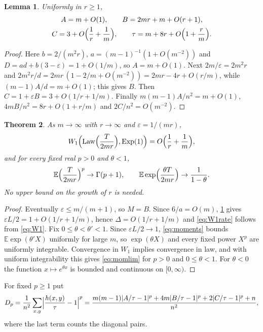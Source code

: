 \documentclass[11pt,a4paper]{article}
\numberwithin{equation}{section}
\newtheorem{theorem}{Theorem}[section]
\newtheorem{lemma}[theorem]{Lemma}
\theoremstyle{remark}
\newcommand{\E}{\mathbb E}
\newcommand{\eps}{\varepsilon}
\newcommand{\Exp}{\operatorname{Exp}}
\newcommand{\abs}[1]{\lvert#1\rvert}
\begin{document}
\begin{lemma}\label{lem:asym}
Uniformly in $r\ge1$,
\begin{gather*}
A=m+O(1),\qquad B=2mr+m+O(r+1),\\
C=3+O\Bigl(\frac1r+\frac1m\Bigr),\qquad \tau=m+8r+O\Bigl(1+\frac rm\Bigr).
\end{gather*}
\end{lemma}

\begin{proof}
Here $b=2/(m^2r)$, $a=(m-1)^{-1}(1+O(m^{-2}))$ and $D=ad+b(3-\eps)=1+O(1/m)$, so $A=m+O(1)$. Next $2m/\eps=2m^2r$ and $2m^2r/d=2mr\,(1-2/m+O(m^{-2}))=2mr-4r+O(r/m)$, while $(m-1)A/d=m+O(1)$; this gives $B$. Then $C=1+\eps B=3+O(1/r+1/m)$. Finally $m(m-1)A/n^2=m+O(1)$, $4mB/n^2=8r+O(1+r/m)$ and $2C/n^2=O(m^{-2})$.
\end{proof}

\begin{theorem}\label{thm:slow}
As $m\to\infty$ with $r\to\infty$ and $\eps=1/(mr)$,
\begin{equation}\label{eq:W1rate}
W_1\Bigl(\mathrm{Law}\Bigl(\frac T{2mr}\Bigr),\Exp(1)\Bigr)=O\Bigl(\frac1r+\frac1m\Bigr),
\end{equation}
and for every fixed real $p>0$ and $\theta<1$,
\begin{equation}\label{eq:momlim}
\E\Bigl(\frac T{2mr}\Bigr)^p\to\Gamma(p+1),\qquad \E\exp\Bigl(\frac{\theta T}{2mr}\Bigr)\to\frac1{1-\theta}.
\end{equation}
No upper bound on the growth of $r$ is needed.
\end{theorem}

\begin{proof}
Eventually $\eps\le m/(m+1)$, so $M=B$. Since $6/a=O(m)$, \cref{lem:asym} gives $\eps L/2=1+O(1/r+1/m)$, hence $\Delta=O(1/r+1/m)$ and \eqref{eq:W1rate} follows from \eqref{eq:W1}. Fix $0\le\theta<\theta'<1$. Since $\eps L/2\to1$, \eqref{eq:moments} bounds $\E\exp(\theta'X)$ uniformly for large $m$, so $\exp(\theta X)$ and every fixed power $X^p$ are uniformly integrable. Convergence in $W_1$ implies convergence in law, and with uniform integrability this gives \eqref{eq:momlim} for $p>0$ and $0\le\theta<1$. For $\theta<0$ the function $x\mapsto e^{\theta x}$ is bounded and continuous on $[0,\infty)$.
\end{proof}

For fixed $p\ge1$ put
\begin{equation}\label{eq:Dp}
D_p=\frac1{n^2}\sum_{x,y}\Bigl|\frac{h(x,y)}\tau-1\Bigr|^p=\frac{m(m-1)\abs{A/\tau-1}^p+4m\abs{B/\tau-1}^p+2\abs{C/\tau-1}^p+n}{n^2},
\end{equation}
where the last term counts the diagonal pairs.
\end{document}
